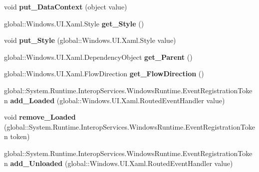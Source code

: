 \begin{DoxyCompactItemize}
void {\bfseries put\+\_\+\+Data\+Context} (object value)
\item 
\mbox{\label{interface_windows_1_1_u_i_1_1_xaml_1_1_i_framework_element_a8acb2f4d3cfe85560c75cdba3730e2dc}} 
global\+::\+Windows.\+U\+I.\+Xaml.\+Style {\bfseries get\+\_\+\+Style} ()
\item 
\mbox{\label{interface_windows_1_1_u_i_1_1_xaml_1_1_i_framework_element_ab113b23a88312132f12dd7ff37c23fc2}} 
void {\bfseries put\+\_\+\+Style} (global\+::\+Windows.\+U\+I.\+Xaml.\+Style value)
\item 
\mbox{\label{interface_windows_1_1_u_i_1_1_xaml_1_1_i_framework_element_a109f23b5d4ff91a61e010793e8f75ef6}} 
global\+::\+Windows.\+U\+I.\+Xaml.\+Dependency\+Object {\bfseries get\+\_\+\+Parent} ()
\item 
\mbox{\label{interface_windows_1_1_u_i_1_1_xaml_1_1_i_framework_element_a80c91718f267bfd344d25ca8701827ab}} 
global\+::\+Windows.\+U\+I.\+Xaml.\+Flow\+Direction {\bfseries get\+\_\+\+Flow\+Direction} ()
\item 
\mbox{\label{interface_windows_1_1_u_i_1_1_xaml_1_1_i_framework_element_a09af92bc5fcaa9a8925401ddcd75d36e}} 
global\+::\+System.\+Runtime.\+Interop\+Services.\+Windows\+Runtime.\+Event\+Registration\+Token {\bfseries add\+\_\+\+Loaded} (global\+::\+Windows.\+U\+I.\+Xaml.\+Routed\+Event\+Handler value)
\item 
\mbox{\label{interface_windows_1_1_u_i_1_1_xaml_1_1_i_framework_element_aafdb3efaeb2c040c7e5209bb37317e74}} 
void {\bfseries remove\+\_\+\+Loaded} (global\+::\+System.\+Runtime.\+Interop\+Services.\+Windows\+Runtime.\+Event\+Registration\+Token token)
\item 
\mbox{\label{interface_windows_1_1_u_i_1_1_xaml_1_1_i_framework_element_ad4ed2f244c6516761d641431768f021b}} 
global\+::\+System.\+Runtime.\+Interop\+Services.\+Windows\+Runtime.\+Event\+Registration\+Token {\bfseries add\+\_\+\+Unloaded} (global\+::\+Windows.\+U\+I.\+Xaml.\+Routed\+Event\+Handler value)

\end{DoxyCompactItemize}
